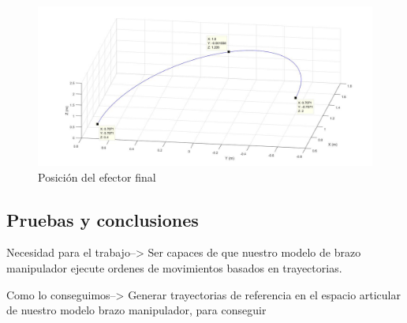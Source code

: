 	\begin{figure}[H]
	\centering
	\includegraphics[width=1\textwidth]{GDT_C_efector}
	\caption{Posición del efector final}
	\end{figure}

	





	
	\subsection{Pruebas y conclusiones}
		Necesidad para el trabajo-->
		 Ser capaces de que nuestro modelo de brazo manipulador ejecute ordenes de movimientos basados en trayectorias.
		  
	    Como lo conseguimos-->
	   		Generar trayectorias de referencia en el espacio articular de nuestro modelo brazo manipulador, para conseguir